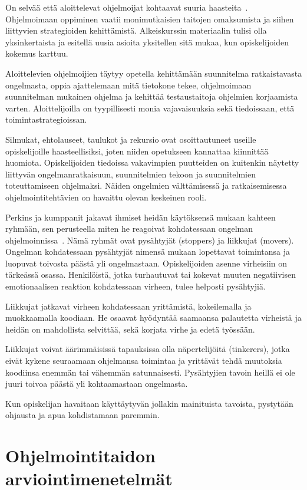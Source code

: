 \documentclass[finnish]{../tktltiki2}
\theoremstyle{definition}
\theoremstyle{remark}
\begin{document}
On selvää että aloittelevat ohjelmoijat kohtaavat suuria haasteita~\cite{RRR03}. Ohjelmoimaan oppiminen vaatii monimutkaisien taitojen omaksumista ja siihen liittyvien strategioiden kehittämistä. Alkeiskurssin materiaalin tulisi olla yksinkertaista ja esitellä uusia asioita yksitellen sitä mukaa, kun opiskelijoiden kokemus karttuu.

Aloittelevien ohjelmoijien täytyy opetella kehittämään suunnitelma ratkaistavasta ongelmasta, oppia ajattelemaan mitä tietokone tekee, ohjelmoimaan suunnitelman mukainen ohjelma ja kehittää testaustaitoja ohjelmien korjaamista varten. Aloittelijoilla on tyypillisesti monia vajavaisuuksia sekä tiedoissaan, että toimintastrategioissan.

Silmukat, ehtolauseet, taulukot ja rekursio ovat osoittautuneet useille opiskelijoille haasteellisiksi, joten niiden opetukseen kannattaa kiinnittää huomiota. Opiskelijoiden tiedoissa vakavimpien puutteiden on kuitenkin näytetty liittyvän ongelmanratkaisuun, suunnitelmien tekoon ja suunnitelmien toteuttamiseen ohjelmaksi. Näiden ongelmien välttämisessä ja ratkaisemisessa ohjelmointitehtävien on havaittu olevan keskeinen rooli.

Perkins ja kumppanit jakavat ihmiset heidän käytöksensä mukaan kahteen ryhmään, sen perusteella miten he reagoivat kohdatessaan ongelman ohjelmoinnissa~\cite{PHHMS86,RRR03}. Nämä ryhmät ovat pysähtyjät (stoppers) ja liikkujat (movers). Ongelman kohdatessaan pysähtyjät nimensä mukaan lopettavat toimintansa ja luopuvat toivosta päästä yli ongelmastaan. Opiskelijoiden asenne virheisiin on tärkeässä osassa. Henkilöistä, jotka turhautuvat tai kokevat muuten negatiivisen emotionaalisen reaktion kohdatessaan virheen, tulee helposti pysähtyjiä.

Liikkujat jatkavat virheen kohdatessaan yrittämistä, kokeilemalla ja muokkaamalla koodiaan. He osaavat hyödyntää saamaansa palautetta virheistä ja heidän on mahdollista selvittää, sekä korjata virhe ja edetä työssään.

Liikkujat voivat äärimmäisissä tapauksissa olla näpertelijöitä (tinkerers), jotka eivät kykene seuraamaan ohjelmansa toimintaa ja yrittävät tehdä muutoksia koodiinsa enemmän tai vähemmän satunnaisesti. Pysähtyjien tavoin heillä ei ole juuri toivoa päästä yli kohtaamastaan ongelmasta.

Kun opiskelijan havaitaan käyttäytyvän jollakin mainituista tavoista, pystytään ohjausta ja apua kohdistamaan paremmin.

\section{Ohjelmointitaidon arviointimenetelmät}
\end{document}

